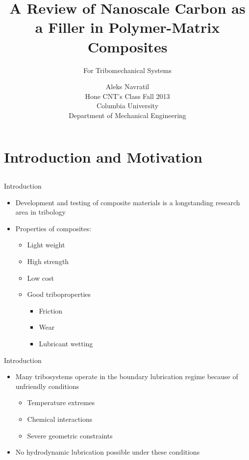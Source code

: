 \documentclass[12pt,letterpaper]{beamer}
\title{A Review of Nanoscale Carbon as a Filler in Polymer-Matrix Composites}
\author{Aleks Navratil \\ Hone CNT's Class Fall 2013 \\ Columbia University \\ Department of Mechanical Engineering \vspace{-1.5cm}}
\date{}
\subtitle[tribo]{For Tribomechanical Systems}
\begin{document}
\begin{frame}[plain]
  \titlepage
\end{frame}

\section{Introduction and Motivation}
\subsection{}

\begin{frame}{Introduction}
\begin{itemize}
\item Development and testing of composite materials is a longstanding research area in tribology

\item Properties of composites:
\begin{itemize}
\item Light weight

\item High strength

\item Low cost

\item Good triboproperties

\begin{itemize}
\item Friction
\item Wear
\item Lubricant wetting
\end{itemize}
\end{itemize}
\end{itemize}
\end{frame}

\begin{frame}{Introduction}
\begin{itemize}
\item Many tribosystems operate in the boundary lubrication regime because of unfriendly conditions
\begin{itemize}
\item Temperature extremes
\item Chemical interactions
\item Severe geometric constraints
\end{itemize}
\item No hydrodynamic lubrication possible under these conditions
\end{itemize}
\end{frame}
\end{document}
